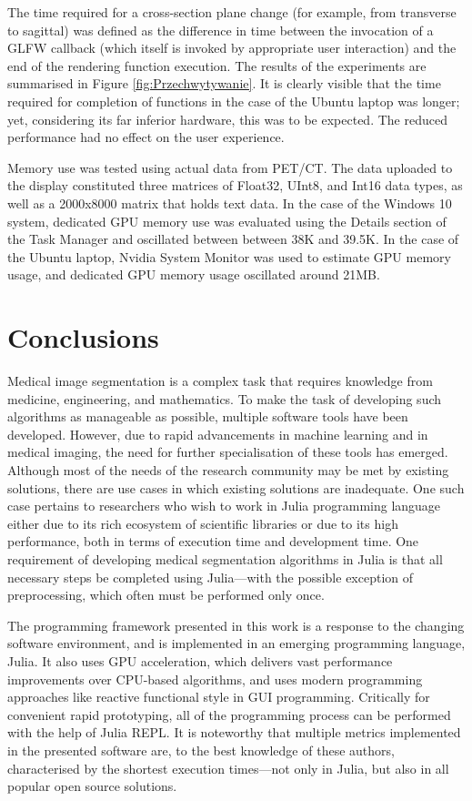 \documentclass{juliacon}
\begin{document}
The time required for a cross-section plane change (for example, from transverse to sagittal) was defined as the difference in time between the invocation of a GLFW callback (which itself is invoked by appropriate user interaction) and the end of the rendering function execution.
The results of the experiments are summarised in Figure \ref{fig:Przechwytywanie}. It is clearly visible that the time required for completion of functions in the case of the Ubuntu laptop was longer; yet, considering its far inferior hardware, this was to be expected. The reduced performance had no effect on the user experience.


Memory use was tested using actual data from PET/CT. The data uploaded to the display constituted three matrices of Float32, UInt8,  and Int16 data types, as well as a 2000x8000 matrix that holds text data. 
In the case of the Windows 10 system, dedicated GPU memory use was evaluated using the Details section of the Task Manager and oscillated between between 38K and 39.5K. In the case of the Ubuntu laptop, Nvidia System Monitor was used to estimate GPU memory usage, and dedicated GPU memory usage oscillated around 21MB. 

\section{Conclusions}
Medical image segmentation is a complex task that requires knowledge from medicine, engineering, and mathematics. To make the task of developing such algorithms as manageable as possible, multiple software tools have been developed. However, due to rapid advancements in machine learning and in medical imaging, the need for further specialisation of these tools has emerged. Although most of the needs of the research community may be met by existing solutions, there are use cases in which existing solutions are inadequate. One such case pertains to researchers who wish to work in Julia programming language either due to its rich ecosystem of scientific libraries or due to its high performance, both in terms of execution time and development time. One requirement of developing medical segmentation algorithms in Julia is that all necessary steps be completed using Julia---with the possible exception of preprocessing, which often must be performed only once.

The programming framework presented in this work is a response to the changing software environment, and is implemented in an emerging programming language, Julia. It also uses GPU acceleration, which delivers vast performance improvements over CPU-based algorithms, and uses modern programming approaches like reactive functional style in GUI programming. Critically for convenient rapid prototyping, all of the programming process can be performed with the help of Julia REPL. It is noteworthy that multiple metrics implemented in the presented software are, to the best knowledge of these authors, characterised by the shortest execution times---not only in Julia, but also in all popular open source solutions. 
\end{document}
